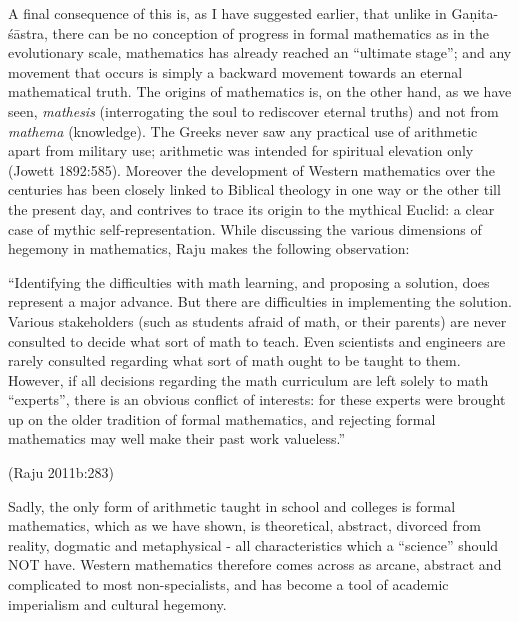 A final consequence of this is, as I have suggested earlier, that unlike in Gaṇita-śāstra, there can be no conception of progress in formal mathematics as in the evolutionary scale, mathematics has already reached an ``ultimate stage''; and any movement that occurs is simply a backward movement towards an eternal mathematical truth. The origins of mathematics is, on the other hand, as we have seen, {\sl mathesis} (interrogating the soul to rediscover eternal truths) and not from {\sl mathema} (knowledge). The Greeks never saw any practical use of arithmetic apart from military use; arithmetic was intended for spiritual elevation only (Jowett 1892:585). Moreover the development of Western mathematics over the centuries has been closely linked to Biblical theology in one way or the other till the present day, and contrives to trace its origin to the mythical Euclid: a clear case of mythic self-representation. While discussing the various dimensions of hegemony in mathematics, Raju makes the following observation:
\begin{myquote}
``Identifying the difficulties with math learning, and proposing a solution, does represent a major advance. But there are difficulties in implementing the solution. Various stakeholders (such as students afraid of math, or their parents) are never consulted to decide what sort of math to teach. Even scientists and engineers are rarely consulted regarding what sort of math ought to be taught to them. However, if all decisions regarding the math curriculum are left solely to math ``experts'', there is an obvious conflict of interests: for these experts were brought up on the older tradition of formal mathematics, and rejecting formal mathematics may well make their past work valueless.'' 

\hfill (Raju 2011b:283) 
\end{myquote}
Sadly, the only form of arithmetic taught in school and colleges is formal mathematics, which as we have shown, is theoretical, abstract, divorced from reality, dogmatic and metaphysical - all characteristics which a ``science'' should NOT have. Western mathematics therefore comes across as arcane, abstract and complicated to most non-specialists, and has become a tool of academic imperialism and cultural hegemony.

